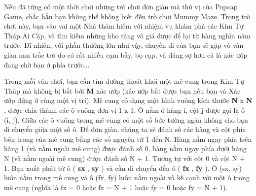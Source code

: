 Nếu đã từng có một thời chơi những trò chơi đơn giản mà thú vị của Popcap Game, chắc hẳn bạn không thể không biết đến trò chơi Mummy Maze. Trong trò chơi này, bạn vào vai một Nhà thám hiểm với nhiệm vụ khám phá các Kim Tự Tháp Ai Cập, và tìm kiếm những kho tàng vô giá được để lại từ hàng nghìn năm trước. Dĩ nhiên, với phần thưởng lớn như vậy, chuyến đi của bạn sẽ gặp vô vàn gian nan trắc trở do có rất nhiều cạm bẫy, bọ cạp, và đáng sợ hơn cả là xác ướp đang chờ bạn ở phía trước...

Trong mỗi ván chơi, bạn cần tìm đường thoát khỏi một mê cung trong Kim Tự Tháp mà không bị bắt bởi \textbf{ M } xác ướp (xác ướp bắt được bạn nếu bạn và Xác ướp đứng ở cùng một vị trí). Mê cung có dạng một hình vuông kích thước \textbf{ N } x \textbf{ N } , được chia thành các ô vuông đơn vị 1 x 1. Ô nằm ở hàng i, cột j được gọi là ô (i, j). Giữa các ô vuông trong mê cung có một số bức tường ngăn không cho bạn di chuyển giữa một số ô. Để đơn giản, chúng ta sẽ đánh số các hàng và cột phía bên trong của mê cung bằng các số nguyên từ 1 đến N. Hàng nằm ngay phía trên hàng 1 (và nằm ngoài mê cung) được đánh số 0, hàng nằm ngay phía dưới hàng N (và nằm ngoài mê cung) được đánh số N + 1. Tương tự với cột 0 và cột N + 1. Bạn xuất phát từ ô ( \textbf{ sx } , \textbf{ sy } ) và cần di chuyển đến ô ( \textbf{ fx } , \textbf{ fy } ). Ô (sx, sy) luôn nằm trong mê cung và ô (fx, fy) luôn nằm ngoài và kề cạnh với một ô trong mê cung (nghĩa là fx = 0 hoặc fx = N + 1 hoặc fy = 0 hoặc fy = N + 1).

